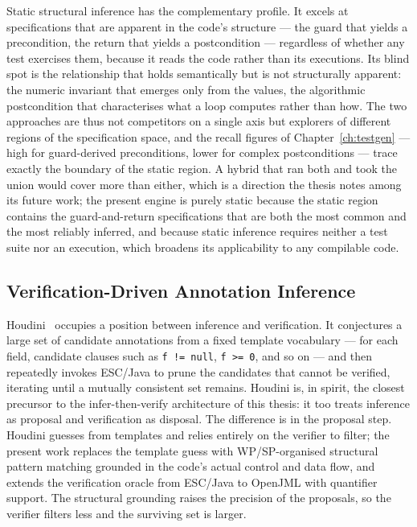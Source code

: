 Static structural inference has the complementary profile. It excels at
specifications that are apparent in the code's structure --- the guard that yields
a precondition, the return that yields a postcondition --- regardless of whether
any test exercises them, because it reads the code rather than its executions. Its
blind spot is the relationship that holds semantically but is not structurally
apparent: the numeric invariant that emerges only from the values, the algorithmic
postcondition that characterises what a loop computes rather than how. The two
approaches are thus not competitors on a single axis but explorers of different
regions of the specification space, and the recall figures of
Chapter~\ref{ch:testgen} --- high for guard-derived preconditions, lower for
complex postconditions --- trace exactly the boundary of the static region. A
hybrid that ran both and took the union would cover more than either, which is a
direction the thesis notes among its future work; the present engine is purely
static because the static region contains the guard-and-return specifications that
are both the most common and the most reliably inferred, and because static
inference requires neither a test suite nor an execution, which broadens its
applicability to any compilable code.

\subsection{Verification-Driven Annotation Inference}

Houdini~\cite{flanagan2001houdini} occupies a position between inference and
verification. It conjectures a large set of candidate annotations from a fixed
template vocabulary --- for each field, candidate clauses such as
\texttt{f != null}, \texttt{f >= 0}, and so on --- and then repeatedly invokes
ESC/Java to prune the candidates that cannot be verified, iterating until a
mutually consistent set remains. Houdini is, in spirit, the closest precursor
to the infer-then-verify architecture of this thesis: it too treats inference
as proposal and verification as disposal. The difference is in the proposal
step. Houdini guesses from templates and relies entirely on the verifier to
filter; the present work replaces the template guess with WP/SP-organised
structural pattern matching grounded in the code's actual control and data
flow, and extends the verification oracle from ESC/Java to OpenJML with
quantifier support. The structural grounding raises the precision of the
proposals, so the verifier filters less and the surviving set is larger.

